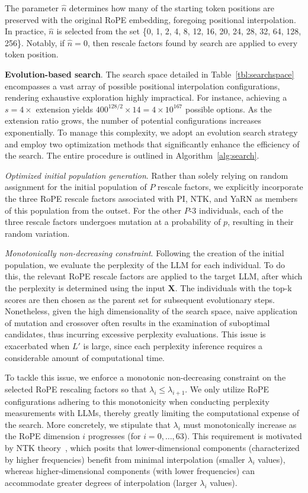 The parameter $\hat{n}$ determines how many of the starting token positions are preserved with the original RoPE embedding, foregoing positional interpolation. In practice, $\hat{n}$ is selected from the set \{0, 1, 2, 4, 8, 12, 16, 20, 24, 28, 32, 64, 128, 256\}. Notably, if $\hat{n}=0$, then rescale factors found by search are applied to every token position.

\textbf{Evolution-based search}. The search space detailed in Table~\ref{tbl:searchspace} encompasses a vast array of possible positional interpolation configurations, rendering exhaustive exploration highly impractical. For instance, achieving a $s=4\times$ extension yields $400^{128/2}\times14 = 4\times10^{167}$ possible options. As the extension ratio grows, the number of potential configurations increases exponentially. To manage this complexity, we adopt an evolution search strategy~\cite{guo2020single} and employ two optimization methods that significantly enhance the efficiency of the search. The entire procedure is outlined in Algorithm~\ref{alg:search}.

\textit{Optimized initial population generation}. Rather than solely relying on random assignment for the initial population of $P$ rescale factors, we explicitly incorporate the three RoPE rescale factors associated with PI, NTK, and YaRN as members of this population from the outset. For the other $P$-3 individuals, each of the three rescale factors undergoes mutation at a probability of $p$, resulting in their random variation.

\textit{Monotonically non-decreasing constraint}. Following the creation of the initial population, we evaluate the perplexity of the LLM for each individual. To do this, the relevant RoPE rescale factors are applied to the target LLM, after which the perplexity is determined using the input $\mathbf{X}$. The individuals with the top-k scores are then chosen as the parent set for subsequent evolutionary steps. Nonetheless, given the high dimensionality of the search space, naive application of mutation and crossover often results in the examination of suboptimal candidates, thus incurring excessive perplexity evaluations. This issue is exacerbated when $L'$ is large, since each perplexity inference requires a considerable amount of computational time.

To tackle this issue, we enforce a monotonic non-decreasing constraint on the selected RoPE rescaling factors so that $\lambda_i\le \lambda_{i+1}$. We only utilize RoPE configurations adhering to this monotonicity when conducting perplexity measurements with LLMs, thereby greatly limiting the computational expense of the search. More concretely, we stipulate that $\lambda_i$ must monotonically increase as the RoPE dimension $i$ progresses (for $i=0,\ldots,63$). This requirement is motivated by NTK theory~\cite{jacot2018neural,tancik2020fourier,ntk}, which posits that lower-dimensional components (characterized by higher frequencies) benefit from minimal interpolation (smaller $\lambda_i$ values), whereas higher-dimensional components (with lower frequencies) can accommodate greater degrees of interpolation (larger $\lambda_i$ values).

